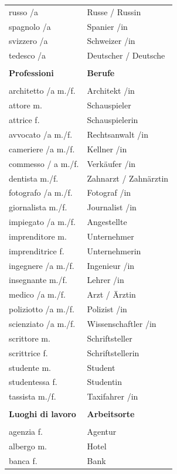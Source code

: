 \documentclass[10pt]{scrartcl}
\begin{document}
\begin{multicols*}{2}
\begin{supertabular}{p{4cm}p{4cm}}
russo /a & Russe / Russin\\
spagnolo /a & Spanier /in\\
svizzero /a & Schweizer /in\\
tedesco /a & Deutscher / Deutsche\\
\\
\textbf{Professioni} & \textbf{Berufe} \\
\\
architetto /a \hfill m./f. & Architekt /in\\
attore \hfill m. & Schauspieler\\
attrice \hfill f. & Schauspielerin\\
avvocato /a \hfill m./f. & Rechtsanwalt /in\\
cameriere /a \hfill m./f. & Kellner /in\\
commesso / a \hfill m./f. & Verkäufer /in\\
dentista \hfill m./f. & Zahnarzt / Zahnärztin\\
fotografo /a \hfill m./f. & Fotograf /in\\
giornalista \hfill m./f. & Journalist /in\\
impiegato /a \hfill m./f. & Angestellte\\
imprenditore \hfill m. & Unternehmer\\
imprenditrice \hfill f. & Unternehmerin\\
ingegnere /a \hfill m./f. & Ingenieur /in\\
insegnante \hfill m./f. & Lehrer /in\\
medico /a \hfill m./f. & Arzt / Ärztin\\
poliziotto /a \hfill m./f. & Polizist /in\\
scienziato /a \hfill m./f. & Wissenschaftler /in\\
scrittore \hfill m. & Schriftsteller\\
scrittrice \hfill f. & Schriftstellerin\\
studente \hfill m. & Student\\
studentessa \hfill f. & Studentin\\
tassista \hfill m./f. & Taxifahrer /in\\
\\
\textbf{Luoghi di lavoro} & \textbf{Arbeitsorte} \\
\\
agenzia \hfill f. & Agentur\\
albergo \hfill m. & Hotel\\
banca \hfill f. & Bank\\

\end{supertabular}
\end{multicols*}
\end{document}
